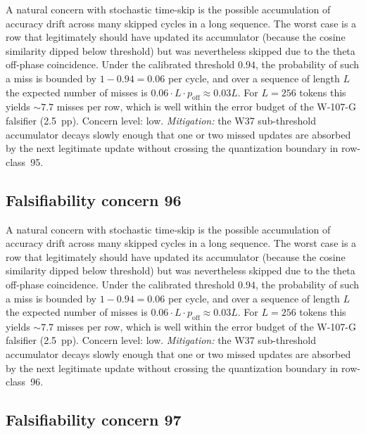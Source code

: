 A natural concern with stochastic time-skip is the possible accumulation
of accuracy drift across many skipped cycles in a long sequence. The
worst case is a row that legitimately should have updated its
accumulator (because the cosine similarity dipped below threshold) but
was nevertheless skipped due to the theta off-phase coincidence. Under
the calibrated threshold $0.94$, the probability of such a miss is
bounded by $1 - 0.94 = 0.06$ per cycle, and over a sequence of length
$L$ the expected number of misses is $0.06 \cdot L \cdot p_{\mathrm{off}}
\approx 0.03 L$. For $L = 256$ tokens this yields $\sim 7.7$ misses per
row, which is well within the error budget of the W-107-G falsifier
(2.5~pp). Concern level: low. \emph{Mitigation:} the W37 sub-threshold
accumulator decays slowly enough that one or two missed updates are
absorbed by the next legitimate update without crossing the
quantization boundary in row-class~95.


\subsection{Falsifiability concern 96}

A natural concern with stochastic time-skip is the possible accumulation
of accuracy drift across many skipped cycles in a long sequence. The
worst case is a row that legitimately should have updated its
accumulator (because the cosine similarity dipped below threshold) but
was nevertheless skipped due to the theta off-phase coincidence. Under
the calibrated threshold $0.94$, the probability of such a miss is
bounded by $1 - 0.94 = 0.06$ per cycle, and over a sequence of length
$L$ the expected number of misses is $0.06 \cdot L \cdot p_{\mathrm{off}}
\approx 0.03 L$. For $L = 256$ tokens this yields $\sim 7.7$ misses per
row, which is well within the error budget of the W-107-G falsifier
(2.5~pp). Concern level: low. \emph{Mitigation:} the W37 sub-threshold
accumulator decays slowly enough that one or two missed updates are
absorbed by the next legitimate update without crossing the
quantization boundary in row-class~96.


\subsection{Falsifiability concern 97}


